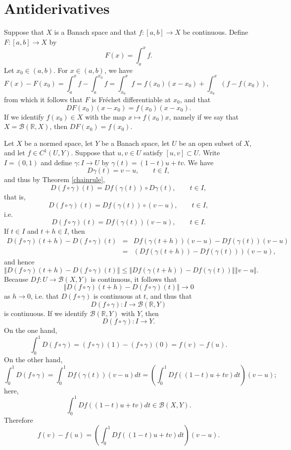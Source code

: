 \documentclass{article}
\newcommand{\norm}[1]{\left\Vert #1 \right\Vert}
\theoremstyle{definition}
\theoremstyle{definition}
\begin{document}
\section{Antiderivatives}
Suppose that $X$ is a Banach space and that $f:[a,b] \to X$ be continuous. Define $F:[a,b] \to X$ by
\[
F(x)=\int_a^x f.
\]
Let $x_0 \in (a,b)$. For $x \in (a,b)$, we have
\[
F(x)-F(x_0)=\int_a^x f - \int_a^{x_0} f = \int_{x_0}^x f = f(x_0)(x-x_0)+\int_{x_0}^x (f-f(x_0)),
\]
from which it follows that $F$ is Fr\'echet differentiable at $x_0$, and that
\[
DF(x_0)(x-x_0)=f(x_0)(x-x_0).
\]
If we identify $f(x_0) \in X$ with the map $x \mapsto f(x_0)x$, namely if we say that $X=\mathscr{B}(\mathbb{R},X)$, then $DF(x_0)=f(x_0)$. 

Let $X$ be a normed space, let $Y$ be a Banach space,  let $U$ be an open subset of $X$, and let $f \in C^1(U,Y)$.
Suppose that $u,v \in U$ satisfy $[u,v] \subset U$. Write $I=(0,1)$ 
and define $\gamma:I \to U$ by $\gamma(t)=(1-t)u+tv$.
We have
\[
D\gamma(t)=v-u, \qquad t \in I,
\]
and thus by Theorem \ref{chainrule}, 
\[
D(f \circ \gamma)(t) = Df(\gamma(t)) \circ D\gamma(t), \qquad t \in I,
\]
that is,
\[
D(f \circ \gamma)(t) = Df(\gamma(t)) \circ (v-u), \qquad t \in I,
\]
i.e.
\[
D(f\circ \gamma)(t) = Df(\gamma(t))(v-u), \qquad t \in I.
\]
If $t \in I$ and $t+h \in I$, then
\begin{eqnarray*}
D(f\circ \gamma)(t+h)
-D(f\circ \gamma)(t) &=& Df(\gamma(t+h))(v-u)-
Df(\gamma(t))(v-u)\\
&=&\left(Df(\gamma(t+h))-Df(\gamma(t))\right)(v-u),
\end{eqnarray*}
and hence
\[
\norm{D(f\circ \gamma)(t+h)
-D(f\circ \gamma)(t)} \leq \norm{Df(\gamma(t+h))-Df(\gamma(t))} \norm{v-u}.
\]
Because $Df:U \to \mathscr{B}(X,Y)$ is continuous, it follows that 
\[
\norm{D(f\circ \gamma)(t+h)
-D(f\circ \gamma)(t)} \to 0
\]
as $h \to 0$, i.e. that $D(f \circ \gamma)$ is continuous at $t$, and thus that
\[
D(f \circ \gamma):I \to \mathscr{B}(\mathbb{R},Y)
\]
is continuous. If we identify $\mathscr{B}(\mathbb{R},Y)$ with $Y$, then
\[
D(f \circ \gamma):I \to Y.
\]
On the one hand,
\[
\int_0^1 D(f \circ \gamma) = (f \circ \gamma)(1)-(f \circ \gamma)(0)=f(v)-f(u).
\]
On the other hand,
\[
\int_0^1 D(f\circ \gamma) = \int_0^1 Df(\gamma(t))(v-u) dt = \left( \int_0^1 Df((1-t)u+tv) dt \right) (v-u);
\]
here,
\[
\int_0^1 Df((1-t)u+tv) dt  \in \mathscr{B}(X,Y).
\]
Therefore
\[
f(v)-f(u)=  \left( \int_0^1 Df((1-t)u+tv) dt \right) (v-u).
\]
\end{document}
